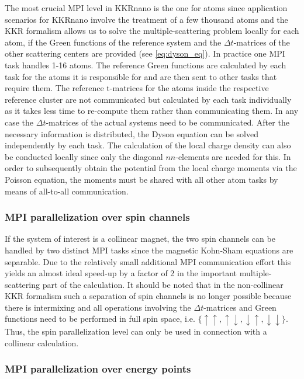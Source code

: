 \documentclass[graybox]{svmult}
\begin{document}
The most crucial MPI level in KKRnano is the one for atoms since application scenarios for KKRnano
involve the treatment of a few thousand atoms and the KKR formalism allows us to solve the
multiple-scattering problem locally for each atom, if the Green functions of the reference system and
the $\Delta t$-matrices of the other scattering centers are provided (see \cref{eq:dyson_eq}).
In practice one MPI task handles 1-16 atoms.
The reference Green functions are calculated by each task
for the atoms it is responsible for and are then sent to other tasks that require them. 
The reference t-matrices for the atoms inside the respective reference cluster are not communicated 
but calculated by each task individually as it takes less time to re-compute them rather than communicating them.
In any case the $\Delta t$-matrices of the actual systems need to be communicated.
After the necessary information is distributed, the Dyson equation can be solved independently by each task.
The calculation of the local charge density can also be conducted locally since only the diagonal
$nn$-elements are needed for this.
In order to subsequently obtain the potential from the local charge moments via the Poisson equation,
the moments must be shared with all other atom tasks by means of all-to-all communication.

\subsubsection*{MPI parallelization over spin channels}

If the system of interest is a collinear magnet, the two spin channels can be handled by two distinct
MPI tasks since the
magnetic Kohn-Sham equations are separable.
Due to the relatively small additional MPI communication effort
this yields an almost ideal speed-up by a factor of 2 in the important
multiple-scattering part of the calculation.
It should be noted that in the non-collinear KKR formalism such a 
separation of spin channels is no longer possible because 
there is intermixing and all operations involving the
$\Delta t$-matrices and Green functions
need to be performed in full spin space, i.e. $\{\uparrow \uparrow, \uparrow \downarrow,
\downarrow \uparrow, \downarrow \downarrow \}$.
Thus, the spin parallelization level can only be used in connection with
a collinear calculation.


\subsubsection*{MPI parallelization over energy points}
\end{document}
